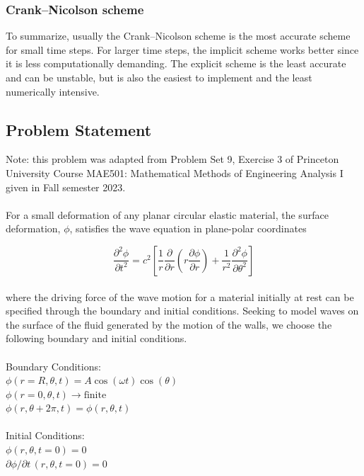 \documentclass{homework}
\begin{document}
\subsubsection{Crank–Nicolson scheme}
To summarize, usually the Crank–Nicolson scheme is the most accurate scheme for small time steps. For larger time steps, the implicit scheme works better since it is less computationally demanding. The explicit scheme is the least accurate and can be unstable, but is also the easiest to implement and the least numerically intensive.

\newpage
\subsection{\textbf{Problem Statement}}
\noindent Note: this problem was adapted from Problem Set 9, Exercise 3 of Princeton University Course MAE501: Mathematical Methods of Engineering Analysis I given in Fall semester 2023.
\\ \\
\noindent For a small deformation of any planar circular elastic material, the surface deformation, $\phi$, satisfies the wave equation in plane-polar coordinates

\[ \frac{\partial^2 \phi}{\partial t^2} = c^2 \left[ \frac{1}{r} \frac{\partial}{\partial r} \left(r \frac{\partial \phi}{\partial r}\right) + \frac{1}{r^2} \frac{\partial^2 \phi}{\partial \theta^2} \right]\]
\\
\noindent where the driving force of the wave motion for a material initially at rest can be specified through the boundary and initial conditions. Seeking to model waves on the surface of the fluid generated by the motion of the walls, we choose the following boundary and initial conditions. \\ \\
\noindent Boundary Conditions: \\
$ \phi(r=R, \theta, t) = A \cos(\omega t) \cos (\theta) $ \\
$ \phi(r=0, \theta, t) \rightarrow \textrm{finite} $ \\
$ \phi(r, \theta + 2\pi, t) = \phi(r, \theta, t) $ \\ \\
\noindent Initial Conditions: \\
$ \phi(r, \theta, t=0) = 0 $ \\
$ \partial \phi/ \partial t \, (r, \theta, t=0) = 0 $
\end{document}
